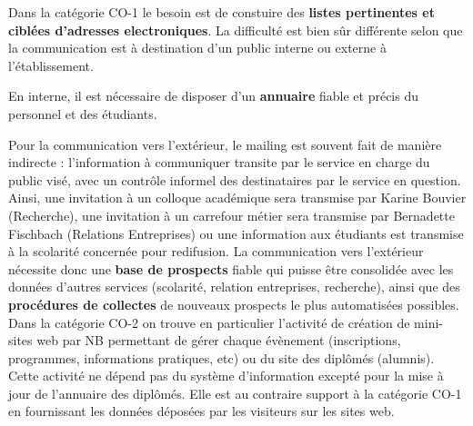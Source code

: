 \documentclass{book}
\begin{document}
Dans la catégorie CO-1 le besoin est de constuire des \textbf{listes 
pertinentes et ciblées d'adresses electroniques}. La difficulté
est bien sûr différente selon que la communication est à destination
d'un public interne ou externe à l'établissement.

En interne, il est nécessaire de disposer d'un \textbf{annuaire}
fiable et précis du personnel et des étudiants. 

Pour la communication vers l'extérieur, le mailing est souvent 
fait de manière indirecte : l'information à communiquer transite par
le service en charge du public visé, avec un contrôle informel des 
destinataires par le service en question. Ainsi, une invitation à un 
colloque académique sera transmise par Karine Bouvier (Recherche),
une invitation à un carrefour métier sera transmise par Bernadette 
Fischbach (Relations Entreprises) ou une information aux étudiants
est transmise à la scolarité concernée pour redifusion. La communication 
vers l'extérieur nécessite donc une \textbf{base de prospects} fiable 
qui puisse être consolidée avec les données d'autres services (scolarité, 
relation entreprises, recherche), ainsi que des \textbf{procédures 
de collectes} de nouveaux prospects le plus automatisées possibles.\\

Dans la catégorie CO-2 on trouve en particulier l'activité de création
de mini-sites web par NB permettant de gérer chaque évènement (inscriptions,
programmes, informations pratiques, etc) ou du site des diplômés (alumnis).
Cette activité ne dépend pas du système d'information excepté pour
la mise à jour de l'annuaire des diplômés. Elle est au contraire 
support à la catégorie CO-1 en fournissant les données déposées par les
visiteurs sur les sites web.\\ 
\end{document}
